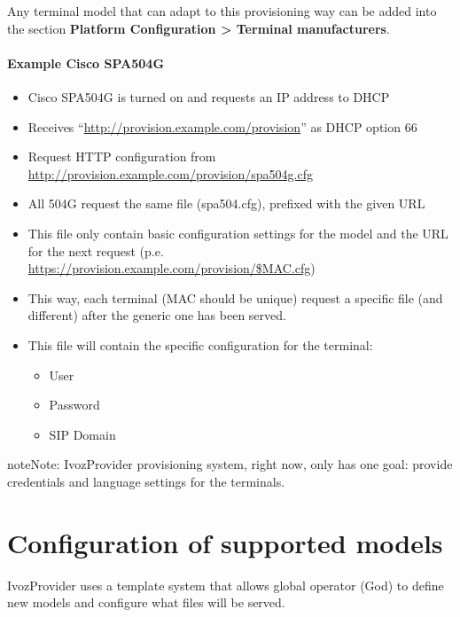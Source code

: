\documentclass[letterpaper,10pt,english]{sphinxmanual}
\begin{document}
Any terminal model that can adapt to this provisioning way can be added into
the section \textbf{Platform Configuration \textgreater{} Terminal manufacturers}.
\paragraph{Example Cisco SPA504G}
\begin{itemize}
\item {} 
Cisco SPA504G is turned on and requests an IP address to DHCP

\item {} 
Receives “\url{http://provision.example.com/provision}” as DHCP option 66

\item {} 
Request HTTP configuration from \url{http://provision.example.com/provision/spa504g.cfg}

\item {} 
All 504G request the same file (spa504.cfg), prefixed with the given URL

\item {} 
This file only contain basic configuration settings for the model and the URL
for the next request (p.e. \url{https://provision.example.com/provision/\$MAC.cfg})

\item {} 
This way, each terminal (MAC should be unique) request a specific file
(and different) after the generic one has been served.

\item {} 
This file will contain the specific configuration for the terminal:
\begin{itemize}
\item {} 
User

\item {} 
Password

\item {} 
SIP Domain

\end{itemize}

\end{itemize}

\begin{notice}{note}{Note:}
IvozProvider provisioning system, right now, only has one goal:
provide credentials and language settings for the terminals.
\end{notice}


\section{Configuration of supported models}
\label{provisioning/index:configuration-of-supported-models}
IvozProvider uses a template system that allows global operator (God) to
define new models and configure what files will be served.
\end{document}
